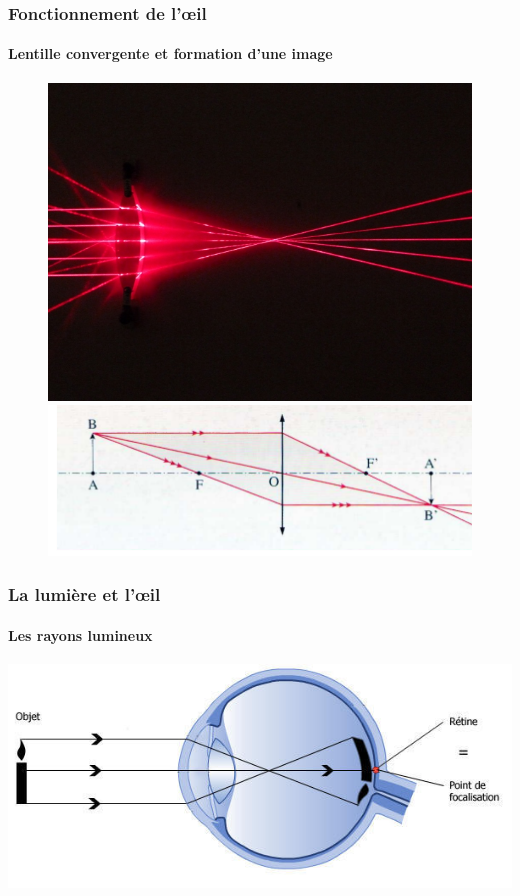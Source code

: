 \documentclass[red]{beamer}
\begin{document}
	\begin{frame}
	\frametitle{Fonctionnement de l'œil}
	\framesubtitle{Lentille convergente et formation d'une image}
	\begin{figure}
		\begin{minipage}[c]{.46\linewidth}
			\includegraphics[scale=0.25]{lentille_convergente}
		\end{minipage} \hfill
		\begin{minipage}[c]{.46\linewidth}
	    	\includegraphics[scale=0.45]{formation_image} 
	    \end{minipage}
	\end{figure}
	\end{frame}
	
	\begin{frame}
	\frametitle{La lumière et l'œil}
	\framesubtitle{Les rayons lumineux}
	\begin{center}
	\includegraphics[scale=0.2]{rayons_lumineux.jpg}
	\end{center}
	\end{frame}
	
\end{document}
